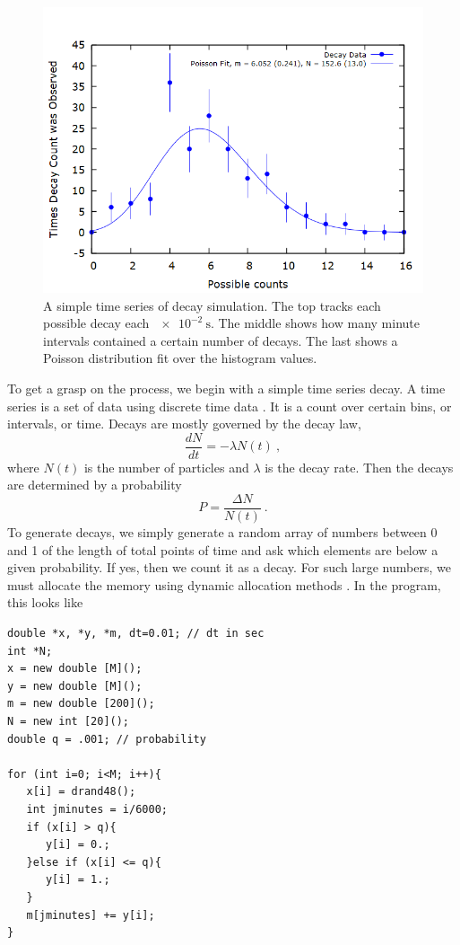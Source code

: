\documentclass[aps,prl,twocolumn,superscriptaddress]{revtex4-1}
\begin{document}
\begin{figure}[htbp]
\begin{center}
 		\includegraphics[scale=0.32]{tsdpois.png}
  		\caption{A simple time series of decay simulation. The top tracks each possible decay each $\SI{e-2}{\s}$. The middle shows how many minute intervals contained a certain number of decays. The last shows a Poisson distribution fit over the histogram values.}
  		\label{gr:tsd}
 	\end{center}
\end{figure}

To get a grasp on the process, we begin with a simple time series decay. A time series is a set of data using discrete time data \cite{tsd}. It is a count over certain bins, or intervals, or time. Decays are mostly governed by the decay law,
\begin{equation}
\frac{dN}{dt} = -\lambda N(t) ~, \label{eqn:declaw}
\end{equation}
where $N(t)$ is the number of particles and $\lambda$ is the decay rate. Then the decays are determined by a probability
\begin{equation}
P = \frac{\Delta N}{N(t)}~. \label{eqn:decprob}
\end{equation}
To generate decays, we simply generate a random array of numbers between 0 and 1 of the length of total points of time and ask which elements are below a given probability. If yes, then we count it as a decay. For such large numbers, we must allocate the memory using dynamic allocation methods \cite{allocation}. In the program, this looks like 
\begin{lstlisting}
double *x, *y, *m, dt=0.01; // dt in sec
int *N;
x = new double [M]();
y = new double [M]();
m = new double [200]();
N = new int [20]();
double q = .001; // probability

for (int i=0; i<M; i++){
   x[i] = drand48();
   int jminutes = i/6000;
   if (x[i] > q){
      y[i] = 0.;
   }else if (x[i] <= q){
      y[i] = 1.;
   }
   m[jminutes] += y[i];
}
\end{lstlisting}
\end{document}
